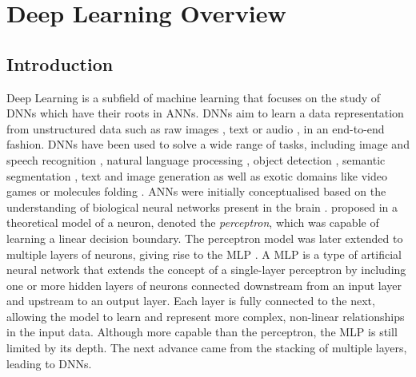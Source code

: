 \chapter{Deep Learning Overview}\label{chap:dlo}

\localtableofcontents

\section{Introduction}

Deep Learning is a subfield of machine learning that focuses on the study of
\DIFdelbegin %
\DIFdelend \DIFaddbegin \acfp{DNN} \DIFaddend which have their roots in \DIFdelbegin %
\DIFdelend \DIFaddbegin \acfp{ANN}\DIFaddend . \acp{DNN} aim to learn a data
representation from unstructured data such as raw images
\cite{DBLP:conf/nips/KrizhevskySH12}, text
\cite{DBLP:conf/emnlp/BudzianowskiV19} or audio
\cite{DBLP:journals/corr/HannunCCCDEPSSCN14}, in an end-to-end fashion.
\acp{DNN} have been used to solve a wide range of tasks, including image and
speech recognition
\cite{DBLP:conf/nips/KrizhevskySH12,DBLP:journals/corr/SimonyanZ14a,DBLP:conf/cvpr/HeZRS16,DBLP:journals/corr/HannunCCCDEPSSCN14,DBLP:conf/icassp/ChanJLV16,DBLP:conf/icml/AmodeiABCCCCCCD16},
natural language processing
\cite{DBLP:conf/emnlp/BudzianowskiV19,DBLP:conf/naacl/DevlinCLT19,DBLP:conf/nips/VaswaniSPUJGKP17},
object detection \cite{DBLP:conf/cvpr/RedmonDGF16,DBLP:conf/nips/RenHGS15},
semantic segmentation \cite{long2015fully,DBLP:conf/cvpr/LiuCSAHY019}, text and
image generation
\cite{goodfellow2020generative,karras2019style,DBLP:conf/emnlp/BudzianowskiV19}
as well as exotic domains like video games
\cite{silver2016mastering,silver2018general} or molecules folding
\cite{jumper2021highly}. \acp{ANN} were initially conceptualised based on the
understanding of biological neural networks present in the brain
\cite{mcculloch1943logical,hebb2005organization}.
\citeauthor{rosenblatt1958perceptron} proposed in
\cite{rosenblatt1958perceptron} a theoretical model of a neuron, denoted the
\emph{perceptron}, which was capable of learning a linear decision boundary. The
perceptron model was later extended to multiple layers of neurons, giving rise
to the \acf{MLP} \cite{rosenblatt1961principles,rumelhart1986learning}. A
\acl{MLP} is a type of artificial neural network that extends the concept of a
single-layer perceptron by including one or more hidden layers of neurons
connected downstream from an input layer and upstream to an output layer. Each
layer is fully connected to the next, allowing the model to learn and represent
more complex, non-linear relationships in the input data. Although more capable
than the perceptron, the \ac{MLP} is still limited by its depth. The next
advance came from the stacking of multiple layers, leading to \aclp{DNN}.\\

